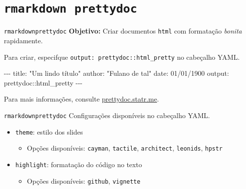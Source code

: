 \documentclass[
  10pt,
  ignorenonframetext,
]{beamer}
\newenvironment{Shaded}{\begin{snugshade}}{\end{snugshade}}
\newcommand{\AttributeTok}[1]{\textcolor[rgb]{0.40,0.45,0.13}{#1}}
\newcommand{\FunctionTok}[1]{\textcolor[rgb]{0.28,0.35,0.67}{#1}}
\newcommand{\KeywordTok}[1]{\textcolor[rgb]{0.00,0.23,0.31}{#1}}
\newcommand{\PreprocessorTok}[1]{\textcolor[rgb]{0.68,0.00,0.00}{#1}}
\newcommand{\StringTok}[1]{\textcolor[rgb]{0.13,0.47,0.30}{#1}}
\providecommand{\tightlist}{%
  \setlength{\itemsep}{0pt}\setlength{\parskip}{0pt}}\usepackage{longtable,booktabs,array}
\begin{document}
\hypertarget{rmarkdown-prettydoc}{%
\section{\texorpdfstring{\texttt{rmarkdown}\newline\newline~\texttt{prettydoc}}{rmarkdown~prettydoc}}\label{rmarkdown-prettydoc}}

\begin{frame}[fragile]{\texttt{rmarkdown}\newline \texttt{prettydoc}}
\protect\hypertarget{rmarkdownprettydoc}{}
\textbf{Objetivo:} Criar documentos \texttt{html} com formatação
\emph{bonita} rapidamente.

Para criar, especifque \texttt{output:\ prettydoc::html\_pretty} no
cabeçalho YAML.

\begin{Shaded}
\begin{Highlighting}[]
\PreprocessorTok{{-}{-}{-}}
\FunctionTok{title}\KeywordTok{:}\AttributeTok{ }\StringTok{"Um lindo título"}
\FunctionTok{author}\KeywordTok{:}\AttributeTok{ }\StringTok{"Fulano de tal"}
\FunctionTok{date}\KeywordTok{:}\AttributeTok{ 01/01/1900}
\FunctionTok{output}\KeywordTok{:}\AttributeTok{ prettydoc::html\_pretty}
\PreprocessorTok{{-}{-}{-}}
\end{Highlighting}
\end{Shaded}

Para mais informações, consulte
\href{https://prettydoc.statr.me/}{prettydoc.statr.me}.
\end{frame}

\begin{frame}[fragile]{\texttt{rmarkdown}\newline \texttt{prettydoc}}
\protect\hypertarget{rmarkdownprettydoc-1}{}
Configurações disponíveis no cabeçalho YAML.

\begin{itemize}
\tightlist
\item
  \texttt{theme}: estilo dos slides

  \begin{itemize}
  \tightlist
  \item
    Opções disponíveis: \texttt{cayman}, \texttt{tactile},
    \texttt{architect}, \texttt{leonids}, \texttt{hpstr}
  \end{itemize}
\item
  \texttt{highlight}: formatação do código no texto

  \begin{itemize}
  \tightlist
  \item
    Opções disponíveis: \texttt{github}, \texttt{vignette}
  \end{itemize}
\end{itemize}
\end{frame}
\end{document}
